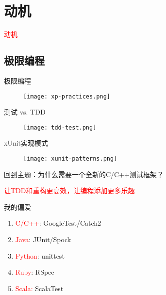 \section{动机}
\label{sec:motivation}

\begin{frame}
  \begin{center}
    \Huge{\textcolor{red}{动机}}
  \end{center}
\end{frame}

\subsection{极限编程}

\begin{frame}{极限编程}
    \centering
    \begin{figure}
      \centering
      \texttt{[image: xp-practices.png]}
    \end{figure}
\end{frame}

\begin{frame}{测试 vs. TDD}
    \centering
    \begin{figure}
      \centering
      \texttt{[image: tdd-test.png]}
    \end{figure}
\end{frame}

\begin{frame}{xUnit实现模式}
    \centering
    \begin{figure}
      \centering
      \texttt{[image: xunit-patterns.png]}
    \end{figure}
\end{frame}

\begin{frame}{回到主题：为什么需要一个全新的C/C++测试框架？}
  \begin{center}
    \LARGE{\textcolor{red}{让TDD和重构更高效，让编程添加更多乐趣}}
  \end{center}
\end{frame}

\begin{frame}{我的偏爱} 
  \begin{enumerate}
    \item \textcolor{red}{C/C++}: GoogleTest/Catch2
    \item \textcolor{red}{Java}: JUnit/Spock
    \item \textcolor{red}{Python}: unittest
    \item \textcolor{red}{Ruby}: RSpec
    \item \textcolor{red}{Scala:} ScalaTest
  \end{enumerate}
\end{frame}

